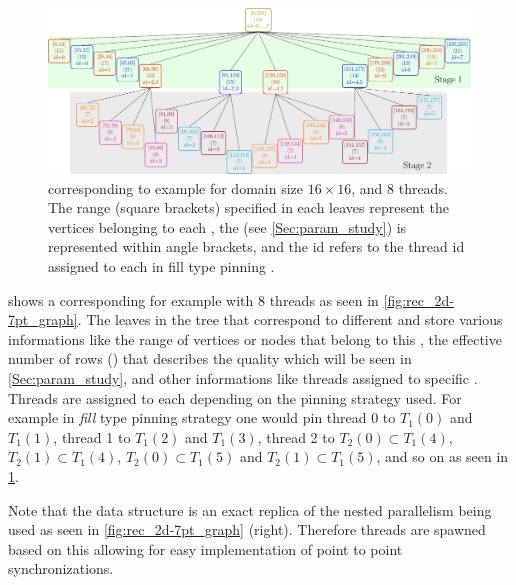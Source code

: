 	 \begin{figure}[thbp]
		 \includegraphics[width=\textwidth, height=0.2\textheight]{pics/recursion/2d-7pt_example/tree/tree}
	 	\caption{\levelTree corresponding to \STEX example for domain size $16 \times 16$, and 8 threads. The range (square brackets) specified in each leaves represent the vertices belonging to each \levelGroup, the \nrowsEff (see \cref{Sec:param_study}) is represented within angle brackets, and the id refers to the thread id assigned to each \levelGroups in fill type pinning .}
	 	\label{fig:rec_2d-7pt_tree}
	 \end{figure}

 
  shows a \levelTree corresponding for \STEX example with 8 threads as seen in \cref{fig:rec_2d-7pt_graph}. The leaves in the tree that correspond to different \levelGroups and store various informations like the range of vertices or nodes that belong to this \levelGroup, the effective number of rows (\nrowsEff) that describes the quality which will be seen in \cref{Sec:param_study}, and other informations like threads assigned to specific \levelGroups.  Threads are assigned to each \levelGroup depending on the pinning strategy used. For example in \emph{fill} type pinning strategy one would pin thread 0 to $T_1(0)$ and $T_1(1)$, thread 1 to $T_1(2)$ and $T_1(3)$, thread 2 to $T_2(0)  \subset T_1(4)$, $T_2(1) \subset T_1(4)$, $T_2(0)  \subset T_1(5)$ and $T_2(1) \subset T_1(5)$, and so on as seen in \cref{fig:rec_2d-7pt_tree}. 
 
 Note that the \levelTree data structure is an exact replica of the nested parallelism being used as seen in \cref{fig:rec_2d-7pt_graph} (right). Therefore threads are spawned based on this \levelTree allowing for easy implementation of point to point synchronizations.


